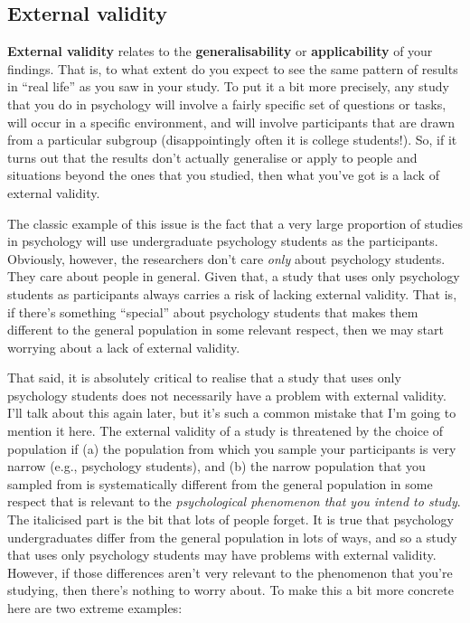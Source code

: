 \documentclass[
  a4paper,
]{book}
\begin{document}
\subsection{External validity}\label{external-validity}

\textbf{External validity} relates to the \textbf{generalisability} or
\textbf{applicability} of your findings. That is, to what extent do you
expect to see the same pattern of results in ``real life'' as you saw in
your study. To put it a bit more precisely, any study that you do in
psychology will involve a fairly specific set of questions or tasks,
will occur in a specific environment, and will involve participants that
are drawn from a particular subgroup (disappointingly often it is
college students!). So, if it turns out that the results don't actually
generalise or apply to people and situations beyond the ones that you
studied, then what you've got is a lack of external validity.

The classic example of this issue is the fact that a very large
proportion of studies in psychology will use undergraduate psychology
students as the participants. Obviously, however, the researchers don't
care \emph{only} about psychology students. They care about people in
general. Given that, a study that uses only psychology students as
participants always carries a risk of lacking external validity. That
is, if there's something ``special'' about psychology students that
makes them different to the general population in some relevant respect,
then we may start worrying about a lack of external validity.

That said, it is absolutely critical to realise that a study that uses
only psychology students does not necessarily have a problem with
external validity. I'll talk about this again later, but it's such a
common mistake that I'm going to mention it here. The external validity
of a study is threatened by the choice of population if (a) the
population from which you sample your participants is very narrow (e.g.,
psychology students), and (b) the narrow population that you sampled
from is systematically different from the general population in some
respect that is relevant to the \emph{psychological phenomenon that you
intend to study}. The italicised part is the bit that lots of people
forget. It is true that psychology undergraduates differ from the
general population in lots of ways, and so a study that uses only
psychology students may have problems with external validity. However,
if those differences aren't very relevant to the phenomenon that you're
studying, then there's nothing to worry about. To make this a bit more
concrete here are two extreme examples:
\end{document}
